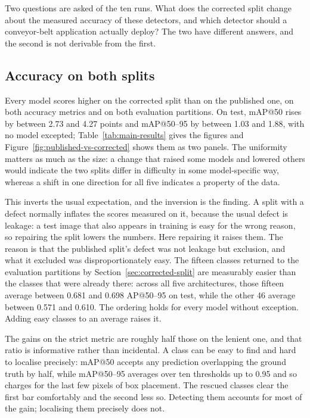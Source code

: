 Two questions are asked of the ten runs. What does the corrected split change
about the measured accuracy of these detectors, and which detector should a
conveyor-belt application actually deploy? The two have different answers, and
the second is not derivable from the first.

\subsection{Accuracy on both splits}
\label{sec:accuracy}

Every model scores higher on the corrected split than on the published one, on
both accuracy metrics and on both evaluation partitions. On test, mAP@50 rises
by between 2.73 and 4.27 points and mAP@50--95 by between 1.03 and 1.88, with no
model excepted; Table~\ref{tab:main-results} gives the figures and
Figure~\ref{fig:published-vs-corrected} shows them as two panels. The uniformity
matters as much as the size: a change that raised some models and lowered others
would indicate the two splits differ in difficulty in some model-specific way,
whereas a shift in one direction for all five indicates a property of the data.

This inverts the usual expectation, and the inversion is the finding. A split
with a defect normally inflates the scores measured on it, because the usual
defect is leakage: a test image that also appears in training is easy for the
wrong reason, so repairing the split lowers the numbers. Here repairing it
raises them. The reason is that the published split's defect was not leakage but
exclusion, and what it excluded was disproportionately easy. The fifteen classes
returned to the evaluation partitions by Section~\ref{sec:corrected-split} are
measurably easier than the classes that were already there: across all five
architectures, those fifteen average between 0.681 and 0.698 AP@50--95 on test,
while the other 46 average between 0.571 and 0.610. The ordering holds for every
model without exception. Adding easy classes to an average raises it.

The gains on the strict metric are roughly half those on the lenient one, and
that ratio is informative rather than incidental. A class can be easy to find
and hard to localise precisely: mAP@50 accepts any prediction overlapping the
ground truth by half, while mAP@50--95 averages over ten thresholds up to 0.95
and so charges for the last few pixels of box placement. The rescued classes
clear the first bar comfortably and the second less so. Detecting them accounts
for most of the gain; localising them precisely does not.

